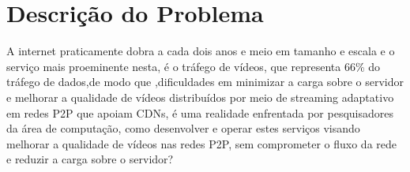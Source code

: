 \documentclass[
	12pt,				%
	oneside,			%
	a4paper,			%
	english,			%
	brazil				%
	]{abntex2ppgsi}
\begin{document}


\section{Descrição do Problema}
 
A internet praticamente dobra a cada dois anos e meio em tamanho e escala e o serviço mais proeminente nesta, é o tráfego de vídeos, que representa 66\% do tráfego de dados,de modo que ,dificuldades em minimizar a carga sobre o servidor e melhorar a qualidade de vídeos distribuídos por meio de streaming adaptativo em redes P2P que apoiam CDNs, é uma realidade enfrentada por pesquisadores da área de computação,  como desenvolver e operar estes serviços visando melhorar a qualidade de vídeos nas redes P2P, sem comprometer o fluxo da rede e reduzir a carga sobre o servidor?
\end{document}

